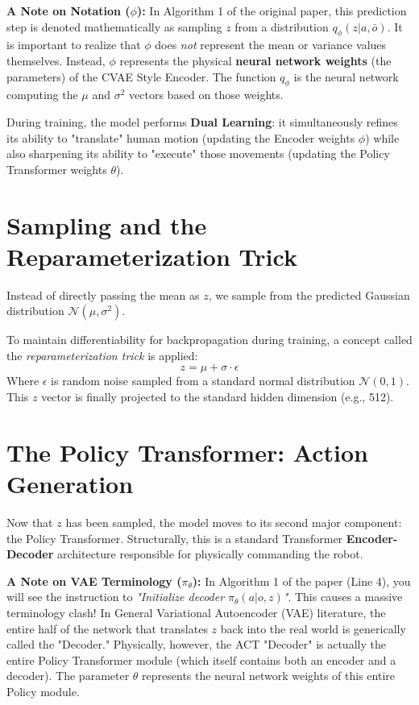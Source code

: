 \documentclass[11pt,a4paper]{article}
\begin{document}
\textbf{A Note on Notation ($\phi$):} In Algorithm 1 of the original paper, this prediction step is denoted mathematically as sampling $z$ from a distribution $q_\phi(z|a, \bar{o})$. It is important to realize that $\phi$ does \textit{not} represent the mean or variance values themselves. Instead, $\phi$ represents the physical \textbf{neural network weights} (the parameters) of the CVAE Style Encoder. The function $q_\phi$ is the neural network computing the $\mu$ and $\sigma^2$ vectors based on those weights.

During training, the model performs \textbf{Dual Learning}: it simultaneously refines its ability to "translate" human motion (updating the Encoder weights $\phi$) while also sharpening its ability to "execute" those movements (updating the Policy Transformer weights $\theta$). 

\section{Sampling and the Reparameterization Trick}
Instead of directly passing the mean as $z$, we sample from the predicted Gaussian distribution $\mathcal{N}(\mu, \sigma^2)$. 

To maintain differentiability for backpropagation during training, a concept called the \textit{reparameterization trick} is applied:
\[ z = \mu + \sigma \cdot \epsilon \]
Where $\epsilon$ is random noise sampled from a standard normal distribution $\mathcal{N}(0, 1)$. This $z$ vector is finally projected to the standard hidden dimension (e.g., 512).

\section{The Policy Transformer: Action Generation}
Now that $z$ has been sampled, the model moves to its second major component: the Policy Transformer. Structurally, this is a standard Transformer \textbf{Encoder-Decoder} architecture responsible for physically commanding the robot.

\textbf{A Note on VAE Terminology ($\pi_\theta$):} In Algorithm 1 of the paper (Line 4), you will see the instruction to \textit{"Initialize decoder $\pi_\theta(a|o, z)$"}. This causes a massive terminology clash! In General Variational Autoencoder (VAE) literature, the entire half of the network that translates $z$ back into the real world is generically called the "Decoder." Physically, however, the ACT "Decoder" is actually the entire Policy Transformer module (which itself contains both an encoder and a decoder). The parameter $\theta$ represents the neural network weights of this entire Policy module.
\end{document}

